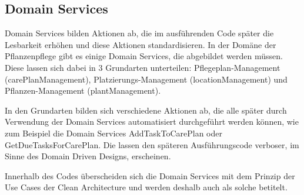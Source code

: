 \subsection*{Domain Services}
Domain Services bilden Aktionen ab, die im ausführenden Code später die Lesbarkeit erhöhen und diese Aktionen standardisieren.  In der Domäne der Pflanzenpflege gibt es einige Domain Services, die abgebildet werden müssen. Diese lassen sich dabei in 3 Grundarten unterteilen: Pflegeplan-Management (carePlanManagement), Platzierungs-Management (locationManagement) und Pflanzen-Management (plantManagement).
\par
In den Grundarten bilden sich verschiedene Aktionen ab, die alle später durch Verwendung der Domain Services automatisiert durchgeführt werden können, wie zum Beispiel die Domain Services AddTaskToCarePlan oder GetDueTasksForCarePlan. Die lassen den späteren Ausführungscode verboser, im Sinne des Domain Driven Designs, erscheinen.
\par
Innerhalb des Codes überscheiden sich die Domain Services mit dem Prinzip der Use Cases der Clean Architecture und werden deshalb auch als solche betitelt.
